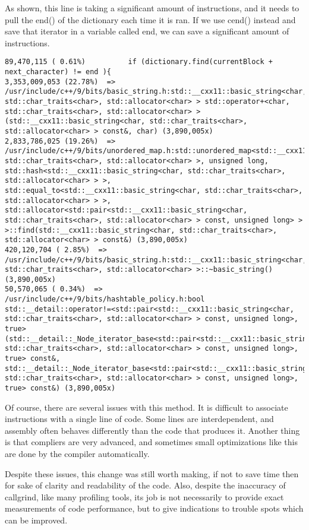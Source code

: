\documentclass[12pt,twoside]{reedthesis}
\begin{document}
As shown, this line is taking a significant amount of instructions, and it needs to pull the end() of the dictionary each time it is ran. If we use cend() instead and save that iterator in a variable called end, we can save a significant amount of instructions.
\begin{verbatim}
89,470,115 ( 0.61%)          if (dictionary.find(currentBlock + next_character) != end ){
3,353,009,053 (22.78%)  => /usr/include/c++/9/bits/basic_string.h:std::__cxx11::basic_string<char, std::char_traits<char>, std::allocator<char> > std::operator+<char, std::char_traits<char>, std::allocator<char> >(std::__cxx11::basic_string<char, std::char_traits<char>, std::allocator<char> > const&, char) (3,890,005x)
2,833,786,025 (19.26%)  => /usr/include/c++/9/bits/unordered_map.h:std::unordered_map<std::__cxx11::basic_string<char, std::char_traits<char>, std::allocator<char> >, unsigned long, std::hash<std::__cxx11::basic_string<char, std::char_traits<char>, std::allocator<char> > >, std::equal_to<std::__cxx11::basic_string<char, std::char_traits<char>, std::allocator<char> > >, std::allocator<std::pair<std::__cxx11::basic_string<char, std::char_traits<char>, std::allocator<char> > const, unsigned long> > >::find(std::__cxx11::basic_string<char, std::char_traits<char>, std::allocator<char> > const&) (3,890,005x)
420,120,704 ( 2.85%)  => /usr/include/c++/9/bits/basic_string.h:std::__cxx11::basic_string<char, std::char_traits<char>, std::allocator<char> >::~basic_string() (3,890,005x)
50,570,065 ( 0.34%)  => /usr/include/c++/9/bits/hashtable_policy.h:bool std::__detail::operator!=<std::pair<std::__cxx11::basic_string<char, std::char_traits<char>, std::allocator<char> > const, unsigned long>, true>(std::__detail::_Node_iterator_base<std::pair<std::__cxx11::basic_string<char, std::char_traits<char>, std::allocator<char> > const, unsigned long>, true> const&, std::__detail::_Node_iterator_base<std::pair<std::__cxx11::basic_string<char, std::char_traits<char>, std::allocator<char> > const, unsigned long>, true> const&) (3,890,005x)
\end{verbatim}
Of course, there are several issues with this method. It is difficult to associate instructions with a single line of code. Some lines are interdependent, and assembly often behaves differently than the code that produces it. Another thing is that compliers are very advanced, and sometimes small optimizations like this are done by the compiler automatically.

Despite these issues, this change was still worth making, if not to save time then for sake of clarity and readability of the code. Also, despite the inaccuracy of callgrind, like many profiling tools, its job is not necessarily to provide exact measurements of code performance, but to give indications to trouble spots which can be improved.
\end{document}
